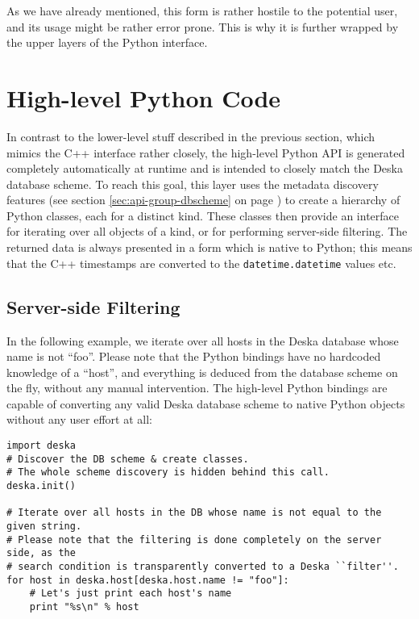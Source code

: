 \documentclass[deska]{subfiles}
\begin{document}
As we have already mentioned, this form is rather hostile to the potential user, and its usage might be rather error
prone.  This is why it is further wrapped by the upper layers of the Python interface.

\section{High-level Python Code}

In contrast to the lower-level stuff described in the previous section, which mimics the C++ interface rather closely,
the high-level Python API is generated completely automatically at runtime and is intended to closely match the Deska
database scheme.  To reach this goal, this layer uses the metadata discovery features (see section
\ref{sec:api-group-dbscheme} on page \pageref{sec:api-group-dbscheme}) to create a hierarchy of Python classes, each for
a distinct kind.  These classes then provide an interface for iterating over all objects of a kind, or for performing
server-side filtering.  The returned data is always presented in a form which is native to Python; this means that the
C++ timestamps are converted to the {\tt datetime.datetime} values etc.

\subsection{Server-side Filtering}

In the following example, we iterate over all hosts in the Deska database whose name is not ``foo''.  Please note that
the Python bindings have no hardcoded knowledge of a ``host'', and everything is deduced from the database scheme on the
fly, without any manual intervention.  The high-level Python bindings are capable of converting any valid Deska database
scheme to native Python objects without any user effort at all:

\begin{verbatim}
import deska
# Discover the DB scheme & create classes.
# The whole scheme discovery is hidden behind this call.
deska.init()

# Iterate over all hosts in the DB whose name is not equal to the given string.
# Please note that the filtering is done completely on the server side, as the
# search condition is transparently converted to a Deska ``filter''.
for host in deska.host[deska.host.name != "foo"]:
    # Let's just print each host's name
    print "%s\n" % host
\end{verbatim}
\end{document}
